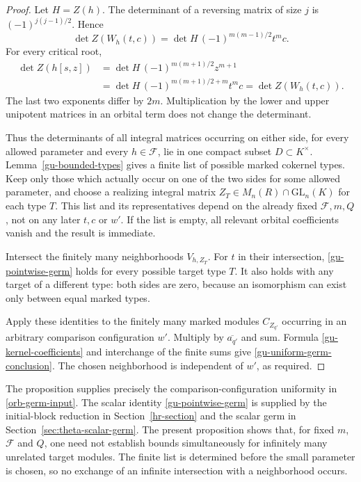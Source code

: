 \begin{proof}
Let $H=Z(h)$. The determinant of a reversing matrix of size $j$
is $(-1)^{j(j-1)/2}$. Hence
\[
 \det Z(W_h(t,c))
      =\det H\,(-1)^{m(m-1)/2}t^mc.
\]
For every critical root,
\begin{align*}
 \det Z(h[s,z])
  &=\det H\,(-1)^{m(m+1)/2}z^{m+1}\\
  &=\det H\,(-1)^{m(m+1)/2+m}t^mc
    =\det Z(W_h(t,c)).
\end{align*}
The last two exponents differ by $2m$. Multiplication by the
lower and upper unipotent matrices in an orbital term does not
change the determinant.

Thus the determinants of all integral matrices occurring on
either side, for every allowed parameter and every
$h\in\mathcal F$, lie in one compact subset $D\subset K^\times$.
Lemma~\ref{gu-bounded-types} gives a finite list of possible marked
cokernel types. Keep only those which actually occur on one of
the two sides for some allowed parameter, and choose a realizing
integral matrix $Z_T\in M_n(R)\cap\mathrm{GL}_n(K)$ for each type
$T$. This list and its representatives depend on the already
fixed $\mathcal F,m,Q$, not on any later $t,c$ or $w'$.
If the list is empty, all relevant orbital coefficients vanish
and the result is immediate.

Intersect the finitely many neighborhoods $V_{h,Z_T}$.
For $t$ in their intersection, \eqref{gu-pointwise-germ} holds
for every possible target type $T$. It also holds with any target
of a different type: both sides are zero, because an isomorphism
can exist only between equal marked types.

Apply these identities to the finitely many marked modules
$C_{Z_{q'}}$ occurring in an arbitrary comparison configuration
$w'$. Multiply by $\overline{a_{q'}}$ and sum. Formula
\eqref{gu-kernel-coefficients} and interchange of the finite sums
give \eqref{gu-uniform-germ-conclusion}. The chosen neighborhood
is independent of $w'$, as required.
\end{proof}

The proposition supplies precisely the comparison-configuration
uniformity in \eqref{orb-germ-input}. The scalar identity
\eqref{gu-pointwise-germ} is supplied by the initial-block
reduction in Section~\ref{hr-section} and the scalar germ in
Section~\ref{sec:theta-scalar-germ}. The present proposition
shows that, for fixed $m$, $\mathcal F$ and $Q$,
one need not establish bounds simultaneously for infinitely many
unrelated target modules. The finite list is determined before
the small parameter is chosen, so no exchange of an infinite
intersection with a neighborhood occurs.


